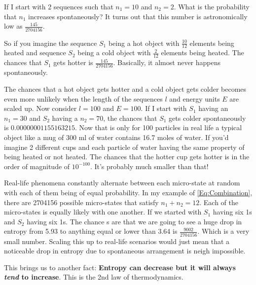 \vspace{0,3cm}
If I start with 2 sequences such that $n_{1}=10$ and $n_{2}=2$. What is the probability that $n_{1}$ increases spontaneously? It turns out that this number is astronomically low as $\frac{145}{2704156}$. \par

\vspace{0,3cm}
So if you imagine the sequence $S_{1}$ being a hot object with $\frac{10}{12}$ elements being heated and sequence $S_{2}$ being a cold object with $\frac{2}{12}$ elements being heated. The chances that $S_{1}$ gets hotter is $\frac{145}{2704156}$. Basically, it almost never happens spontaneously. \par

\vspace{0.3cm}
The chances that a hot object gets hotter and a cold object gets colder becomes even more unlikely when the length of the sequences $l$ and energy units $E$ are scaled up. Now consider $l=100$ and $E=100$. If I start with $S_{1}$ having an $n_{1}=30$ and $S_{2}$ having a $n_{2}=70$, the chances that $S_{1}$ gets colder spontaneously is $ 0.00000001155163215 $. Now that is only for 100 particles in real life a typical object like a mug of 300 ml of water contains 16.7 moles of water. If you'd imagine 2 different cups and each particle of water having the same property of being heated or not heated. The chances that the hotter cup gets hotter is in the order of magnitude of $ 10^{-100}$. It's probably much smaller than that! \par

\vspace{0,3cm}
Real-life phenomena constantly alternate between each micro-state at random with each of them being of equal probability. In my example of \ref{Eq:Combination}, there are 2704156 possible micro-states that satisfy $n_{1}+n_{2}=12$. Each of the micro-states is equally likely with one another. If we started with $S_{1}$ having six 1s and $S_{2}$ having six 1s. The chance s are that we are going to see a huge drop in entropy from 5.93 to anything equal or lower than 3.64 is $\frac{9002}{2704156}$. Which is a very small number. Scaling this up to real-life scenarios would just mean that a noticeable drop in entropy due to spontaneous arrangement is neigh impossible. \par

\vspace{0.3cm}
This brings us to another fact: \textbf{Entropy can decrease but it will always \emph{tend} to increase}. This is the 2nd law of thermodynamics.\par

